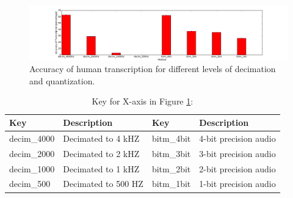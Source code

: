     \begin{figure}[H]
    \centering
    \includegraphics[width=\textwidth]{sound/mturk_survey.pdf}
    \caption{Accuracy of human transcription for different levels of decimation and quantization.}
    \label{fig:mturk_survey}
    \end{figure}
    \begin{table}[H]
    \begin{tabularx}{\textwidth}{l | l | l | l}
    \textbf{Key} & \textbf{Description} & \textbf{Key} & \textbf{Description} \\
    \hline
    decim\_4000 & Decimated to 4 kHZ & bitm\_4bit & 4-bit precision audio \\
    decim\_2000 & Decimated to 2 kHZ & bitm\_3bit & 3-bit precision audio \\
    decim\_1000 & Decimated to 1 kHZ & bitm\_2bit & 2-bit precision audio \\
    decim\_500 & Decimated to 500 HZ & bitm\_1bit & 1-bit precision audio \\
    \end{tabularx}
    \caption{Key for X-axis in Figure \ref{fig:mturk_survey}: }
    \label{tab:key_mturk_survey}
    \end{table}

